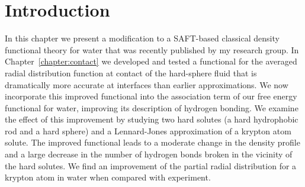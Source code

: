 \label{chapter:saft}
\def\re{\text{Re}}
\def\im{\text{Im}}
\def\ket#1{\vert #1 \rangle}
\def\cU{{\cal{U}}}
\def\cD{{\cal{D}}}
\def\re{\text{Re}}
\def\im{\text{Im}}

\newcommand\etadisp{\ensuremath{\eta_\textit{d}}}
\newcommand\epsilondisp{\ensuremath{\epsilon_\textit{d}}}
\newcommand\epsilonassoc{\ensuremath{\epsilon_\textit{a}}}
\newcommand\kappaassoc{\ensuremath{\kappa_\textit{a}}}
\newcommand\lambdadisp{\ensuremath{\lambda_\textit{d}}}
\newcommand\lscale{\ensuremath{s_d}}

\newcommand\hughesetal{Hughes \emph{et al.}}

\newcommand\hughesetalcite{Hughes \emph{et al.}~\cite{hughes2013classical}}

\section{Introduction}
In this chapter we present a modification to a SAFT-based classical
density functional theory for water that was recently published by my
research group\cite{hughes2013classical}.  In
Chapter~\ref{chapter:contact} we developed and tested a functional for
the averaged radial distribution function at contact of the
hard-sphere fluid that is dramatically more accurate at interfaces
than earlier approximations.
%
We now incorporate this improved functional into the association term
of our free energy functional for water, improving its description of
hydrogen bonding.
%
We examine the effect of this improvement by studying two hard solutes
(a
hard hydrophobic rod and a hard sphere) and a Lennard-Jones
approximation of a krypton atom solute.
%
The improved functional leads to a moderate change in the density
profile and a large decrease in the number of hydrogen bonds broken in
the vicinity of the hard solutes.
%
We find an improvement of the partial radial distribution for a
krypton atom in water when compared with experiment.


